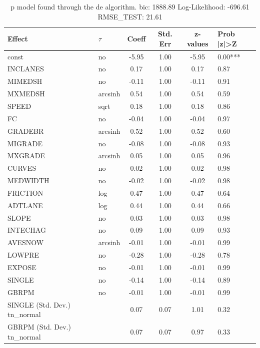\begin{table}
	\caption{p model found through the de algorithm. bic: 1888.89 Log-Likelihood: -696.61 RMSE_TEST: 21.61}
	\begin{center}
		\begin{tabular}{|l|l|c|c|c|l|}
			\hline
			Effect & $\tau$ & Coeff & Std. Err & z-values & Prob |z|>Z \\
			\hline
			const & no & -5.95 & 1.00 & -5.95 & 0.00*** \\
			\hline
			INCLANES & no & 0.17 & 1.00 & 0.17 & 0.87 \\
			\hline
			MIMEDSH & no & -0.11 & 1.00 & -0.11 & 0.91 \\
			\hline
			MXMEDSH & arcsinh & 0.54 & 1.00 & 0.54 & 0.59 \\
			\hline
			SPEED & sqrt & 0.18 & 1.00 & 0.18 & 0.86 \\
			\hline
			FC & no & -0.04 & 1.00 & -0.04 & 0.97 \\
			\hline
			GRADEBR & arcsinh & 0.52 & 1.00 & 0.52 & 0.60 \\
			\hline
			MIGRADE & no & -0.08 & 1.00 & -0.08 & 0.93 \\
			\hline
			MXGRADE & arcsinh & 0.05 & 1.00 & 0.05 & 0.96 \\
			\hline
			CURVES & no & 0.02 & 1.00 & 0.02 & 0.98 \\
			\hline
			MEDWIDTH & no & -0.02 & 1.00 & -0.02 & 0.98 \\
			\hline
			FRICTION & log & 0.47 & 1.00 & 0.47 & 0.64 \\
			\hline
			ADTLANE & log & 0.44 & 1.00 & 0.44 & 0.66 \\
			\hline
			SLOPE & no & 0.03 & 1.00 & 0.03 & 0.98 \\
			\hline
			INTECHAG & no & 0.09 & 1.00 & 0.09 & 0.93 \\
			\hline
			AVESNOW & arcsinh & -0.01 & 1.00 & -0.01 & 0.99 \\
			\hline
			LOWPRE & no & -0.28 & 1.00 & -0.28 & 0.78 \\
			\hline
			EXPOSE & no & -0.01 & 1.00 & -0.01 & 0.99 \\
			\hline
			SINGLE & no & -0.14 & 1.00 & -0.14 & 0.89 \\
			\hline
			GBRPM & no & -0.01 & 1.00 & -0.01 & 0.99 \\
			\hline
			SINGLE (Std. Dev.) tn_normal &  & 0.07 & 0.07 & 1.01 & 0.32 \\
			\hline
			GBRPM (Std. Dev.) tn_normal &  & 0.07 & 0.07 & 0.97 & 0.33 \\
			\hline
		\end{tabular}
	\end{center}
\end{table}